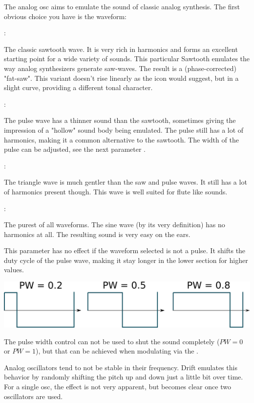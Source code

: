 The analog osc aims to emulate the sound of classic analog synthesis. The first obvious choice you have is the waveform:

{

:

The classic sawtooth wave. It is very rich in harmonics and forms an excellent starting point for a wide variety of sounds. This particular Sawtooth emulates the way analog synthesizers generate saw-waves. The result is a (phase-corrected) "fat-saw". This variant doesn't rise linearly as the icon would suggest, but in a slight curve, providing a different tonal character.

:

The pulse wave has a thinner sound than the sawtooth, sometimes giving the impression of a "hollow" sound body being emulated. The pulse still has a lot of harmonics, making it a common alternative to the sawtooth. The width of the pulse can be adjusted, see the next parameter .

:

The triangle wave is much gentler than the saw and pulse waves. It still has a lot of harmonics present though. This wave is well suited for flute like sounds.

:

The purest of all waveforms. The sine wave (by its very definition) has no harmonics at all. The resulting sound is very easy on the ears.}

{This parameter has no effect if the waveform selected is not a pulse. It shifts the duty cycle of the pulse wave, making it stay longer in the lower section for higher values.

\begin{center}
    \includegraphics[width=\textwidth]{graphics/PWM.png}
\end{center}

The pulse width control can not be used to shut the sound completely ($PW = 0$ or $PW = 1$), but that can be achieved when modulating via the \modmatrix.}

{Analog oscillators tend to not be stable in their frequency. Drift emulates this behavior by randomly shifting the pitch up and down just a little bit over time. For a single osc, the effect is not very apparent, but becomes clear once two oscillators are used.}

